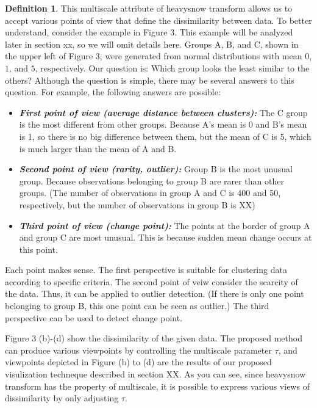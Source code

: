 \documentclass[preprint, review, 12pt]{article}
\theoremstyle{definition}
\newtheorem{dfn}{Definition}
\theoremstyle{remark}
\begin{document}
\begin{dfn}
This multiscale attribute of heavysnow transform allows us to accept various points of view that define the dissimilarity between data. To better understand, consider the example in Figure 3. This example will be analyzed later in section xx, so we will omit details here. Groups A, B, and C, shown in the upper left of Figure 3, were generated from normal distributions with mean $0$, $1$, and $5$, respectively. Our question is:  
 Which group looks the least similar to the others? Although the question is simple, there may be several answers to this question. For example, the following answers are possible:
\begin{itemize}
\item \textbf{\it First point of view (average distance between clusters):} The C group is the most different from other groups. Because A's mean is 0 and B's mean is 1, so there is no big difference between them, but the mean of C is 5, which is much larger than the mean of A and B.
\item \textbf{\it Second point of view (rarity, outlier):} Group B is the most unusual group. Because observations belonging to group B are rarer than other groups. (The number of observations in group A and C is 400 and 50, respectively, but the number of observations in group B is XX)
\item \textbf{\it Third point of view (change point):} The points at the border of group A and group C are most unusual. This is because  sudden mean change occurs at this point.
\end{itemize}
Each point makes sense. The first perspective is suitable for clustering data according to specific criteria. The second point of veiw consider the scarcity of the data. Thus, it can be applied to outlier detection. (If there is only one point belonging to group B, this one point can be seen as outlier.) The third perspective can be used to detect change point. 

Figure 3 (b)-(d) show the dissimilarity of the given data. The proposed method can produce various viewpoints by controlling the multiscale parameter $\tau$,  and viewpoints depicted in Figure (b) to (d) are the results of our proposed visulization techneque described in section XX. As you can see, since heavysnow transform has the property of multiscale, it is possible to express various views of dissimilarity by only adjusting $\tau$.


\end{dfn}
\end{document}
